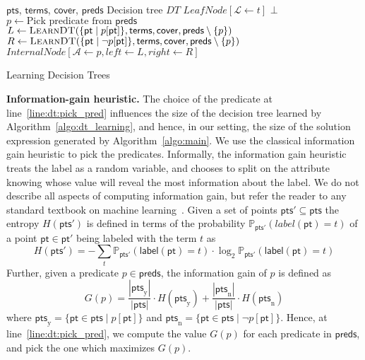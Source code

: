 \documentclass{llncs}
\newcommand\Points{\mathsf{pts}}
\newcommand\Point{\mathsf{pt}}
\newcommand\Predicates{\mathsf{preds}}
\newcommand\Pred{p}
\newcommand\Terms{\mathsf{terms}}
\newcommand\Term{t}
\newcommand\Cover{\mathsf{cover}}
\newcommand\Prob[2]{\mathbb{P}_{#1}(#2)}
\newcommand\DecisionTree{\mathit{DT}}
\newcommand\Attribute{\mathcal{A}}
\newcommand\Label{\mathcal{L}}
\renewcommand{\paragraph}[1]{\par\noindent\textbf{#1.}}
\newcommand{\labl}[1]{\mathsf{label}(#1)}
\begin{document}
\begin{algorithm}
  \begin{algorithmic}[1]
    \fontsize{8}{10}\selectfont
    \Require $\Points$, $\Terms$, $\Cover$, $\Predicates$
    \Ensure Decision tree $\DecisionTree$
    \If { $\exists \Term : \Points \subseteq \Cover[\Term]$ }\label{line:dt:single}
    \Return $\mathit{LeafNode}[\Label \gets \Term]$ \label{line:dt:leaf}
    \EndIf
    \If {$\Predicates = \emptyset$} \Return $\bot$ \EndIf \label{line:dt:bot}
    \State $\Pred \gets \mbox{Pick predicate from $\Predicates$}$\label{line:dt:pick_pred}
    \State $L \gets \Call{LearnDT}{\{ \Point \mid \Pred[\Point] \},
    \Terms, \Cover, \Predicates \setminus \{ \Pred \} }$\label{line:dt:left}
    \State $R \gets \Call{LearnDT}{\{ \Point \mid \neg \Pred[\Point]
    \}, \Terms, \Cover, \Predicates \setminus \{ \Pred \} }$\label{line:dt:right}
    \State \Return $\mathit{InternalNode}[\Attribute \gets \Pred,  \mathit{left} \gets L , \mathit{right} \gets R ]$
  \end{algorithmic}
  \caption{Learning Decision Trees}
  \label{algo:dt_learning}
\end{algorithm}

\paragraph{Information-gain heuristic}
The choice of the predicate at line~\ref{line:dt:pick_pred} influences
the size of the decision tree learned by
Algorithm~\ref{algo:dt_learning}, and hence, in our setting, the size of
the solution expression generated by Algorithm~\ref{algo:main}.
We use the classical information gain heuristic to pick the predicates.
Informally, the information gain heuristic treats the label as a random
variable, and chooses to split on the attribute knowing whose value
will reveal the most information about the label.
We do not describe all aspects of computing information gain, but
refer the reader to any standard textbook on machine
learning~\cite{bishop-book}.
Given a set of points $\Points' \subseteq \Points$ the entropy
$H(\Points')$ is defined in terms of the probability
$\Prob{\Points'}{label(\Point) = t}$ of a point $\Point \in \Point'$ being
labeled with the term $\Term$ as
\[
H(\Points') = -\sum_{\Term} \Prob{\Points'}{\labl{\Point} = \Term} \cdot \log_2{\Prob{\Points'}{\labl{\Point} = \Term}}
\]
Further, given a predicate $\Pred \in \Predicates$, the information
gain of $\Pred$ is defined as
\[
G(\Pred) = \frac{|\Points_{\mathrm{y}}|}{|\Points|} \cdot
H(\Points_{\mathrm{y}}) + \frac{|\Points_{\mathrm{n}}|}{|\Points|} \cdot
H(\Points_{\mathrm{n}})
\]
where $\Points_{\mathrm{y}} = \{\Point \in \Points \mid \Pred[\Point]\}$ and
$\Points_{\mathrm{n}} = \{\Point \in \Points \mid \neg\Pred[\Point]\}$.
Hence, at line~\ref{line:dt:pick_pred}, we compute the value $G(\Pred)$
for each predicate in $\Predicates$, and pick the one which maximizes
$G(\Pred)$.
\end{document}
